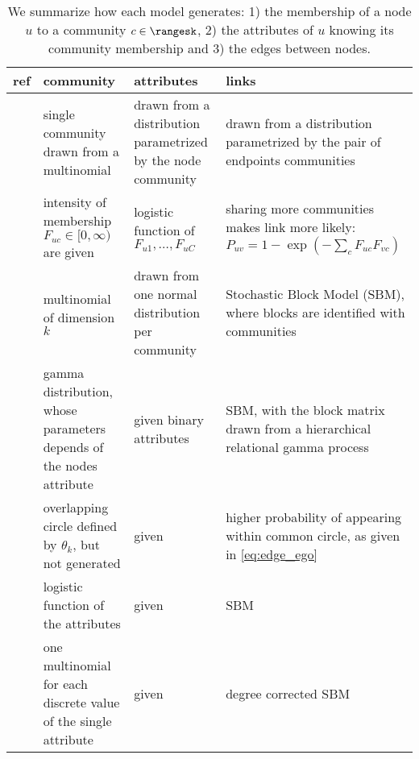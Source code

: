 \setlength{\fullpage}{179mm}
\begin{table*}[tbh]
\begin{adjustwidth}{-2cm}{}
  \centering
  \small
  \caption[Generative model of node attributed graphs with community structure]{We summarize how
    each model generates: 1) the membership of a node $u$ to a community $c
  \in \rangesk$, 2) the attributes of $u$ knowing its community membership and 3) the edges between
nodes.}
  \label{tab:edge_genmodel}
  \bgroup
  \def\arraystretch{1.5}
  \begin{tabulary}{\fullpage}{LLLL}
    \toprule
    ref & community & attributes & links \\
    \midrule

    \autocite{Xu2014} &
    single community drawn from a multinomial &
    drawn from a distribution parametrized by the node community &
    drawn from a distribution parametrized by the pair of endpoints communities \\

    \autocite{Yang2013} &
    intensity of membership $F_{uc} \in [0, \infty)$ are given &
    logistic function of $F_{u1},\ldots,F_{uC}$ &
    sharing more communities makes link more likely:
    $P_{uv} = 1-\exp(-\sum_c F_{uc}F_{vc})$ \\

    \autocite{Kataoka2016} &
    multinomial of dimension $k$ &
    drawn from one normal distribution per community &
    Stochastic Block Model (SBM), where blocks are identified with communities \\

    \midrule

    \autocite{Zhao2017} &
    gamma distribution, whose parameters depends of the nodes attribute &
    given binary attributes &
    SBM, with the block matrix drawn from a hierarchical relational gamma process \\

    \autocites{LeskovecEgo12}{LeskovecEgo14} &
    overlapping circle defined by $\theta_k$, but not generated &
    given &
    higher probability of appearing within common circle, as given in \eqref{eq:edge_ego} \\

    \autocite{Weng2016} &
    logistic function of the attributes &
    given &
    SBM \\

    \autocite{Newman2016} &
    one multinomial for each discrete value of the single attribute &
    given &
    degree corrected SBM \\
    \bottomrule
  \end{tabulary}
  \egroup
\end{adjustwidth}
\end{table*}

